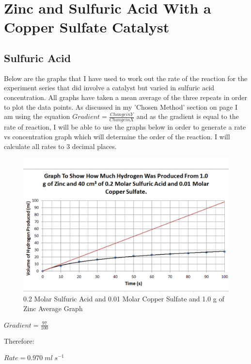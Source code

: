 \section{Zinc and Sulfuric Acid With a Copper Sulfate Catalyst} 


	\subsection{Sulfuric Acid}

Below are the graphs that I have used to work out the rate of the reaction for the experiment series that did involve a catalyst but varied in sulfuric acid concentration. All graphs have taken a mean average of the three repeats in order to plot the data points. As discussed in my 'Chosen Method' section on page \pageref{Chosen Method} I am using the equation $Gradient = \frac{Change in Y}{Change in X}$ and as the gradient is equal to the rate of reaction, I will be able to use the graphs below in order to generate a rate vs concentration graph which will determine the order of the reaction. I will calculate all rates to 3 decimal places.


\begin{figure}[H]
    \includegraphics[width=\textwidth]{./Analysis/Images/2Catalysed/02Molar.pdf}
    \caption{0.2 Molar Sulfuric Acid and 0.01 Molar Copper Sulfate and 1.0 g of Zinc Average Graph} \label{fig:02MolarSACSGradient}
\end{figure}

$Gradient = \frac{97}{100}$

Therefore:

$Rate = 0.970 \; ml \; s^{-1}$

